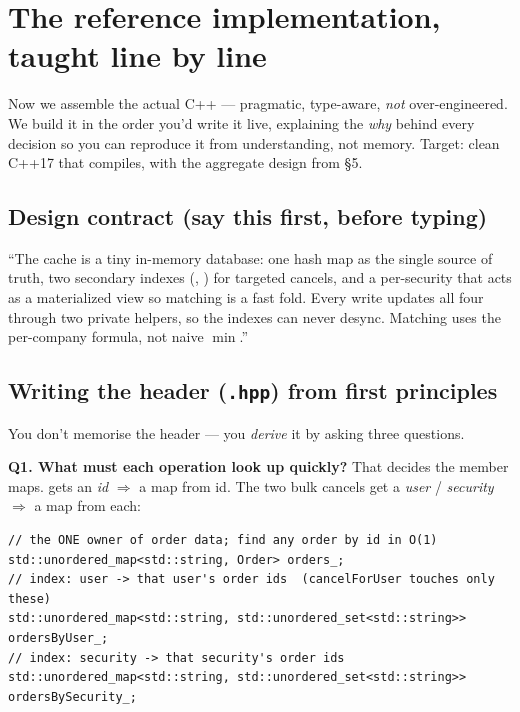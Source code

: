 \section{The reference implementation, taught line by line}

Now we assemble the actual C++ --- pragmatic, type-aware, \emph{not}
over-engineered. We build it in the order you'd write it live, explaining the
\emph{why} behind every decision so you can reproduce it from understanding, not
memory. Target: clean C++17 that compiles, with the aggregate design from \S5.

\subsection{Design contract (say this first, before typing)}

\begin{keybox}
``The cache is a tiny in-memory database: one hash map  as the
single source of truth, two secondary indexes (,
) for targeted cancels, and a per-security
 that acts as a materialized view so matching is a fast fold.
Every write updates all four through two private helpers, so the indexes can
never desync. Matching uses the per-company formula, not naive $\min$.''
\end{keybox}

\subsection{Writing the header (\texttt{.hpp}) from first principles}

You don't memorise the header --- you \emph{derive} it by asking three questions.

\textbf{Q1. What must each operation look up quickly?} That decides the member
maps.  gets an \emph{id} $\Rightarrow$ a map from id. The two
bulk cancels get a \emph{user} / \emph{security} $\Rightarrow$ a map from each:

\begin{lstlisting}
// the ONE owner of order data; find any order by id in O(1)
std::unordered_map<std::string, Order> orders_;
// index: user -> that user's order ids  (cancelForUser touches only these)
std::unordered_map<std::string, std::unordered_set<std::string>> ordersByUser_;
// index: security -> that security's order ids
std::unordered_map<std::string, std::unordered_set<std::string>> ordersBySecurity_;
\end{lstlisting}

